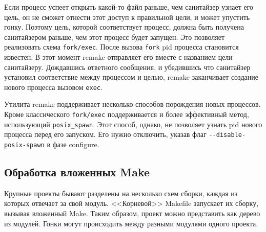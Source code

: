 Если процесс успеет открыть какой-то файл раньше, чем санитайзер узнает его цель, он не сможет отнести этот доступ к правильной цели, и может упустить гонку. Поэтому цель, которой соответствует процесс, должна быть получена санитайзером раньше, чем этот процесс будет запущен. Это позволяет реализовать схема \texttt{fork/exec}. После вызова \texttt{fork} pid процесса становится известен. В этот момент remake отправляет его вместе с названием цели санитайзеру. Дождавшись ответного сообщения, и убедившись что санитайзер установил соответствие между процессом и целью, remake заканчивает создание нового процесса вызовом \texttt{exec}.

Утилита remake поддерживает несколько способов порождения новых процессов. Кроме классического \texttt{fork/exec} поддерживается и более эффективный метод, использующий \texttt{posix\_spawn}. Этот способ, однако, не позволяет узнать pid нового процесса перед его запуском. Его нужно отключить, указав флаг \texttt{-{}-disable-posix-spawn} в фазе configure.

\subsection{Обработка вложенных Make}

Крупные проекты бывают разделены на несколько схем сборки, каждая из которых отвечает за свой модуль. <<Корневой>> Makefile запускает их сборку, вызывая вложенный Make. Таким образом, проект можно представить как дерево из модулей. Гонки могут происходить между разными модулями одного проекта.

